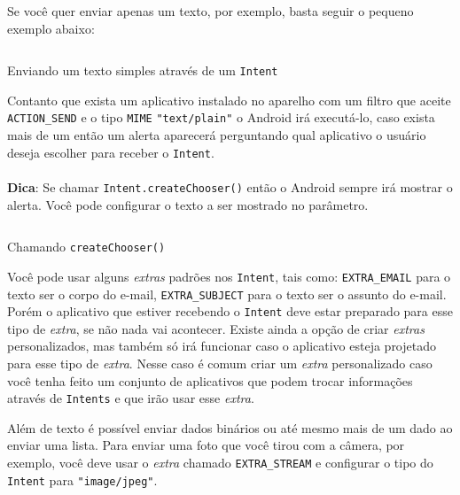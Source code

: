 \documentclass[a4paper,12pt,brazil,oneside]{book}
\begin{document}
\begin{singlespace}
		Se você quer enviar apenas um texto, por exemplo, basta seguir o pequeno exemplo abaixo:

		\begin{listing}[H]
		\inputminted[linenos=true,fontsize=\small,frame=lines, framesep=2mm, tabsize=2,numbersep=5pt]{java}{src/api/sharing/simpletext.java}
		\caption{Enviando um texto simples através de um \texttt{Intent}}
		\label{code:simpletext}
		\end{listing} 		

		Contanto que exista um aplicativo instalado no aparelho com um filtro que aceite \texttt{ACTION\_SEND} e o tipo \texttt{MIME} \texttt{"text/plain"} o Android irá executá-lo, caso exista mais de um então um alerta aparecerá perguntando qual aplicativo o usuário deseja escolher para receber o \texttt{Intent}. 

\begin{framed}
\paragraph{}\textbf{Dica}: Se chamar \texttt{Intent.createChooser()} então o Android sempre irá mostrar o alerta. Você pode configurar o texto a ser mostrado no parâmetro.
\textit{}
\end{framed}

		\begin{listing}[H]
		\inputminted[linenos=true,fontsize=\small,frame=lines, framesep=2mm, tabsize=2,numbersep=5pt]{java}{src/api/sharing/createchooser.java}
		\caption{Chamando \texttt{createChooser()}}
		\label{code:createchooser}
		\end{listing} 		

		Você pode usar alguns \emph{extras} padrões nos \texttt{Intent}, tais como: \texttt{EXTRA\_EMAIL} para o texto ser o corpo do e-mail, \texttt{EXTRA\_SUBJECT} para o texto ser o assunto do e-mail. Porém o aplicativo que estiver recebendo o \texttt{Intent} deve estar preparado para esse tipo de \emph{extra}, se não nada vai acontecer. Existe ainda a opção de criar \emph{extras} personalizados, mas também só irá funcionar caso o aplicativo esteja projetado para esse tipo de \emph{extra}. Nesse caso é comum criar um \emph{extra} personalizado caso você tenha feito um conjunto de aplicativos que podem trocar informações através de \texttt{Intents} e que irão usar esse \emph{extra}.

		Além de texto é possível enviar dados binários ou até mesmo mais de um dado ao enviar uma lista. Para enviar uma foto que você tirou com a câmera, por exemplo, você deve usar o \emph{extra} chamado \texttt{EXTRA\_STREAM} e configurar o tipo do \texttt{Intent} para \texttt{"image/jpeg"}.


\end{singlespace}
\end{document}
